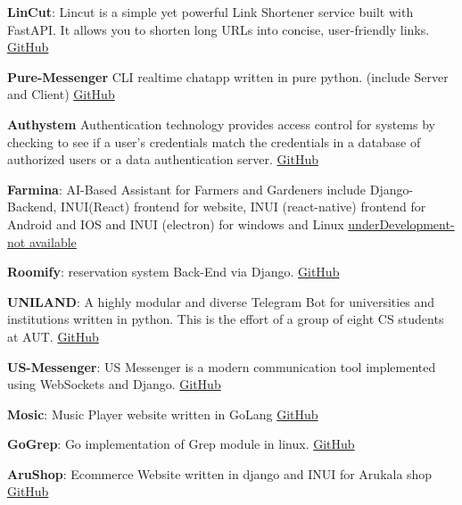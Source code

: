 \documentclass[margin]{res}
\begin{document}
\begin{resume}
\par
\textbf{LinCut}:
Lincut is a simple yet powerful Link Shortener service built with FastAPI. It allows you to shorten long URLs into concise, user-friendly links.
\hfill \href{https://github.com/MohammadrezaAmani/LinCut}{GitHub}

\par
\textbf{Pure-Messenger} 
CLI realtime chatapp written in pure python. (include Server and Client)
\hfill \href{https://github.com/MohammadrezaAmani/Python-Websocket-Chatapp}{GitHub}

\par
\textbf{Authystem} 
Authentication technology provides access control for systems by checking to see if a user's credentials match the credentials in a database of authorized users or a data authentication server.
\hfill \href{https://github.com/MohammadrezaAmani/Authystem}{GitHub}


\par
\textbf{Farmina}: 
AI-Based Assistant for Farmers and Gardeners include Django-Backend, INUI(React) frontend for website, INUI (react-native) frontend for Android and IOS and INUI (electron) for windows and Linux \hfill \href{https://github.com/MohammadrezaAmani/Farmina}{underDevelopment-not available}

\par
\textbf{Roomify}: 
reservation system Back-End via Django.
\hfill \href{https://github.com/MohammadrezaAmani/Roomify}{GitHub}

\par
\textbf{UNILAND}: 
A highly modular and diverse Telegram Bot for universities and institutions written in python. This is the effort of a group of eight CS students at AUT. \hfill \href{https://github.com/MohammadrezaAmani/UniLand}{GitHub}
\par
\textbf{US-Messenger}: 
US Messenger is a modern communication tool implemented using WebSockets and Django.
\hfill \href{https://github.com/MohammadrezaAmani/US-Messenger}{GitHub}

\par
\textbf{Mosic}: 
Music Player website written in GoLang
\hfill \href{https://github.com/MohammadrezaAmani/Mosic}{GitHub}
\par
\textbf{GoGrep}: 
Go implementation of Grep module in linux.
\hfill \href{https://github.com/MohammadrezaAmani/GoGrep}{GitHub}


\par
\textbf{AruShop}: 
Ecommerce Website written in django and INUI for Arukala shop
\hfill \href{https://github.com/MohammadrezaAmani/arushop}{GitHub}


\end{resume}
\end{document}
